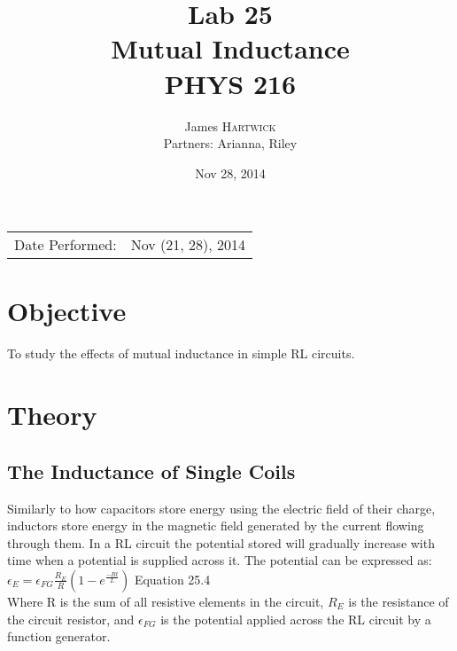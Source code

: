 \documentclass{article}
\title{Lab 25 \\ Mutual Inductance \\ PHYS 216} %
\author{James \textsc{Hartwick}\\Partners: Arianna, Riley} %
\date{Nov 28, 2014} %
\begin{document}
\maketitle %

\begin{center}
\begin{tabular}{l r}
Date Performed: & Nov (21, 28), 2014 \\ %
\end{tabular}
\end{center}



\section{Objective}
To study the effects of mutual inductance in simple RL circuits.
\section{Theory}
\subsection{The Inductance of Single Coils}
Similarly to how capacitors store energy using the electric field of their charge, inductors store energy in the magnetic field generated by the current flowing through them. In a RL circuit the potential stored will gradually increase with time when a potential is supplied across it. The potential can be expressed as:\\

$\epsilon_E=\epsilon_{FG}\frac{R_E}{R}(1-e^{\frac{-Rt}{L}})$ Equation 25.4\\

Where R is the sum of all resistive elements in the circuit, $R_E$ is the resistance of the circuit resistor, and $\epsilon_{FG}$ is the potential applied across the RL circuit by a function generator.
\end{document}
